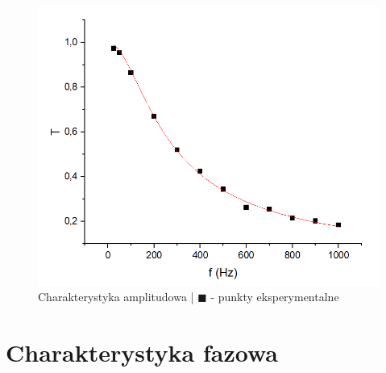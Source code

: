 \begin{itemize}
\begin{figure}[H]
            \includegraphics[scale=0.55]{img_wykresy/amplitudowa_RC.png}
            \caption{Charakterystyka amplitudowa | $\blacksquare$ - punkty eksperymentalne}
            \label{fig:CR_amp}
        \end{figure}
    \end{itemize}

\section{Charakterystyka fazowa}

